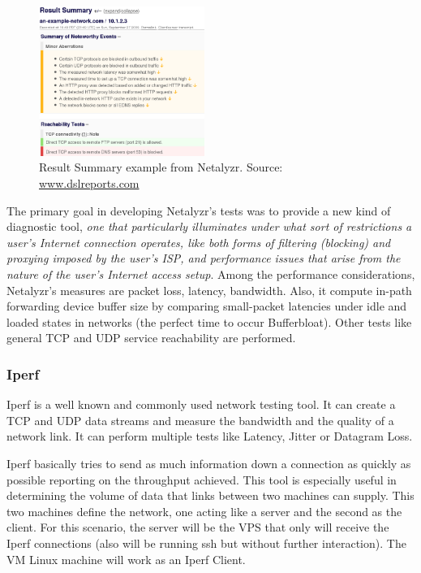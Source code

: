 \begin{figure}
	\begin{center}
		\includegraphics[width=0.48\textwidth]{img/netalyzr_ex}
	\end{center}
	\caption[Result Summary example from Netalyzr]{Result Summary example from Netalyzr. Source:
	\url{www.dslreports.com}}   
	\label{netalyzr_ex} 
\end{figure}

The primary goal in developing Netalyzr's tests was to provide a new kind of
diagnostic tool, \textit{one that particularly illuminates under what sort of
restrictions a user's Internet connection operates, like both forms of filtering
(blocking) and proxying imposed by the user's ISP, and performance issues that
arise from the nature of the user's Internet access setup}\cite{netalyzr}. Among
the performance considerations, Netalyzr's measures are packet loss, latency,
bandwidth. Also, it compute in-path forwarding device buffer size by comparing
small-packet latencies under idle and loaded states in networks (the perfect
time to occur Bufferbloat). Other tests like general TCP and UDP service
reachability are performed.

\subsubsection{Iperf}
Iperf is a well known and commonly used network testing tool. It can create a
TCP and UDP data streams and measure the bandwidth and the quality of a network
link. It can perform multiple tests like Latency, Jitter or Datagram Loss.

Iperf basically tries to send as much information down a connection as quickly
as possible reporting on the throughput achieved. This tool is especially useful
in determining the volume of data that links between two machines can supply.
This two machines define the network, one acting like a server and the second as
the client. For this scenario, the server will be the VPS that only will receive
the Iperf connections (also will be running ssh but without further
interaction). The VM Linux machine will work as an Iperf Client.

